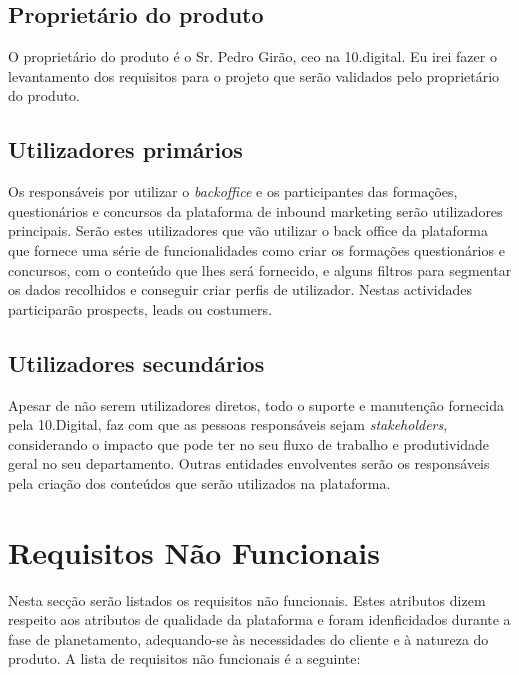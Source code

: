 \subsection{Proprietário do produto}

O proprietário do produto é o Sr. Pedro Girão, \acrshort{ceo} na 10.digital. Eu irei fazer o levantamento dos requisitos para o projeto que serão validados pelo proprietário do produto.

\subsection{Utilizadores primários}

Os responsáveis por utilizar o \textit{backoffice} e os participantes das formações, questionários e concursos da plataforma de inbound marketing serão utilizadores principais. Serão estes utilizadores que vão utilizar o back office da plataforma que fornece uma série de funcionalidades como criar os formações questionários e concursos, com o conteúdo que lhes será fornecido, e alguns filtros para segmentar os dados recolhidos e conseguir criar perfis de utilizador. Nestas actividades participarão prospects, leads ou costumers.


\subsection{Utilizadores secundários}

Apesar de não serem utilizadores diretos, todo o suporte e manutenção fornecida pela 10.Digital, faz com que as pessoas responsáveis sejam \textit{stakeholders}, considerando o impacto que pode ter no seu fluxo de trabalho e produtividade geral no seu departamento. 
Outras entidades envolventes serão os responsáveis pela criação dos conteúdos que serão utilizados na plataforma.


\section{Requisitos Não Funcionais}
\label{rnf}

Nesta secção serão listados os requisitos não funcionais. Estes atributos dizem respeito aos atributos de qualidade da plataforma e foram idenficidados durante a fase de planetamento, adequando-se às necessidades do cliente e à natureza do produto. A lista de requisitos não funcionais é a seguinte:

